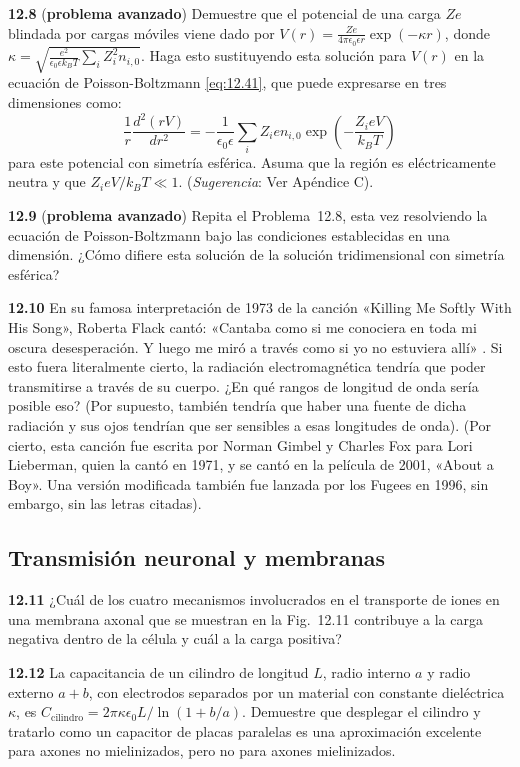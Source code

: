 \documentclass[12pt]{book}
\begin{document}
\noindent \textbf{12.8} (\textbf{problema avanzado}) Demuestre que el potencial de una carga $Ze$ blindada por cargas móviles viene dado por $V(r) = \frac{Ze}{4\pi\epsilon_0\epsilon r} \exp(-\kappa r)$, donde $\kappa = \sqrt{\frac{e^2}{\epsilon_0\epsilon k_B T} \sum_i Z_i^2 n_{i,0}}$. Haga esto sustituyendo esta solución para $V(r)$ en la ecuación de Poisson-Boltzmann \eqref{eq:12.41}, que puede expresarse en tres dimensiones como:
\begin{equation}
\frac{1}{r} \frac{d^2(rV)}{dr^2} = -\frac{1}{\epsilon_0 \epsilon} \sum_i Z_i e n_{i,0} \exp\left(-\frac{Z_i e V}{k_B T}\right)
\label{eq:12.94}
\end{equation}
para este potencial con simetría esférica. Asuma que la región es eléctricamente neutra y que $Z_i e V / k_B T \ll 1$. (\textit{Sugerencia}: Ver Apéndice C).

\noindent \textbf{12.9} (\textbf{problema avanzado}) Repita el Problema~12.8, esta vez resolviendo la ecuación de Poisson-Boltzmann bajo las condiciones establecidas en una dimensión. ¿Cómo difiere esta solución de la solución tridimensional con simetría esférica?

\noindent \textbf{12.10} En su famosa interpretación de 1973 de la canción «Killing Me Softly With His Song», Roberta Flack cantó: «Cantaba como si me conociera en toda mi oscura desesperación. Y luego me miró a través como si yo no estuviera allí» \cite{14}. Si esto fuera literalmente cierto, la radiación electromagnética tendría que poder transmitirse a través de su cuerpo. ¿En qué rangos de longitud de onda sería posible eso? (Por supuesto, también tendría que haber una fuente de dicha radiación y sus ojos tendrían que ser sensibles a esas longitudes de onda). (Por cierto, esta canción fue escrita por Norman Gimbel y Charles Fox para Lori Lieberman, quien la cantó en 1971, y se cantó en la película de 2001, «About a Boy». Una versión modificada también fue lanzada por los Fugees en 1996, sin embargo, sin las letras citadas).

\subsection*{Transmisión neuronal y membranas}

\noindent \textbf{12.11} ¿Cuál de los cuatro mecanismos involucrados en el transporte de iones en una membrana axonal que se muestran en la Fig.~12.11 contribuye a la carga negativa dentro de la célula y cuál a la carga positiva?

\noindent \textbf{12.12} La capacitancia de un cilindro de longitud $L$, radio interno $a$ y radio externo $a + b$, con electrodos separados por un material con constante dieléctrica $\kappa$, es $C_{\text{cilindro}} = 2\pi\kappa\epsilon_0 L / \ln(1 + b/a)$. Demuestre que desplegar el cilindro y tratarlo como un capacitor de placas paralelas es una aproximación excelente para axones no mielinizados, pero no para axones mielinizados.
\end{document}
